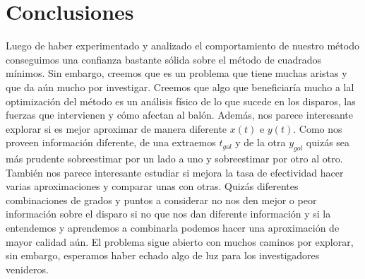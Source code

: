 \section{Conclusiones}

Luego de haber experimentado y analizado el comportamiento de nuestro método conseguimos una confianza bastante sólida sobre el método
de cuadrados mínimos. Sin embargo, creemos que es un problema que tiene muchas aristas y que da aún mucho por investigar. Creemos
que algo que beneficiaría mucho a lal optimización del método es un análisis físico de lo que sucede en los disparos, las fuerzas
que intervienen y cómo afectan al balón. Además, nos parece interesante explorar si es mejor aproximar de manera diferente $x(t)$ e $y(t)$. 
Como nos proveen información diferente, de una extraemos $t_{gol}$ y de la otra $y_{gol}$ quizás sea más prudente sobreestimar por un
lado a uno y sobreestimar por otro al otro. También nos parece interesante estudiar si mejora la tasa de efectividad
hacer varias aproximaciones y comparar unas con otras. Quizás diferentes combinaciones de grados y puntos a considerar no 
nos den mejor o peor información sobre el disparo si no que nos dan diferente información y si la entendemos y aprendemos a combinarla
podemos hacer una aproximación de mayor calidad aún.
El problema sigue abierto con muchos caminos por explorar, sin embargo, esperamos haber echado algo de luz para los investigadores venideros.